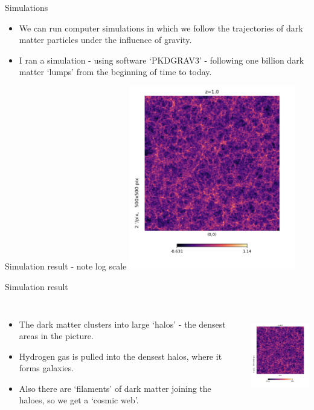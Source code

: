 \documentclass[usenames,dvipsnames]{beamer}
\begin{document}
\begin{frame}{Simulations}
  \begin{block}{}
    \begin{itemize}
      \item{We can run computer simulations in which we follow the trajectories of dark matter particles under the influence of gravity.}
	\item{I ran a simulation - using software `PKDGRAV3' - following one billion dark matter `lumps'  from the beginning of time to today.}
    \end{itemize}
  \end{block}
\end{frame}

\begin{frame}{Simulation result - note log scale}
    \centering
    \includegraphics[height=8cm]{simulation_z_1.png}
\end{frame}
  

\begin{frame}{Simulation result}
  \begin{columns}
    \begin{itemize}
      \item{The dark matter clusters into large `halos' - the densest areas in the picture.}
      \item{Hydrogen gas is pulled into the densest halos, where it forms galaxies.}
	\item{Also there are `filaments' of dark matter joining the haloes, so we get a `cosmic web'.}
    \end{itemize}
    \centering
    \includegraphics[height=4cm]{simulation_z_1.png}
  \end{columns}
\end{frame}
\end{document}
